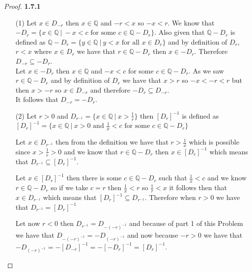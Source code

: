 \documentclass[11pt]{article}
\newcommand{\Q}{\mathbb{Q}}
\theoremstyle{definition}
\begin{document}
    \begin{proof}{\textbf{1.7.1}}
    \begin{itemize}
        \item [(1)]
        Let $x \in D_{-r}$ then $x \in \Q$ and $-r<x$ so $-x<r$. We know that 
        $-D_r = \{x \in \Q ~|~ -x<c\text{ for some }c \in \Q-D_r\}$. Also given that 
        $\Q-D_r$ is defined as $\Q - D_r = \{y \in \Q ~|~ y<x \text{ for all } x \in D_r\}$
        and by definition of $D_r$, $r < x$ where $x \in D_r$ we have that
        $r \in \Q - D_r$ then $x \in -D_r$. Therefore $D_{-r} \subseteq -D_r$.\\
        Let $x \in -D_{r}$ then $x \in \Q$ and $-x<c$ for some $c \in \Q-D_r$. As we
        saw $r \in \Q-D_r$ and by definition of $D_r$ we have that $x>r$ so $-x<-r<r$
        but then $x>-r$ so $x \in D_{-r}$ and therefore $-D_r \subseteq D_{-r}$.\\
        It follows that $D_{-r} = -D_r$.
        \item [(2)]
        Let $r>0$ and $D_{r^{-1}} = \{x \in \Q ~|~ x>\frac{1}{r}\}$ then $[D_r]^{-1}$
        is defined as
        $[D_r]^{-1} = \{x \in \Q ~|~ x>0 \text{ and }\frac{1}{x}<c\text{ for some }c \in \Q-D_r\}$
        
        Let $x \in D_{r^{-1}}$ then from the definition we have that $r > \frac{1}{x}$
        which is possible since $x>\frac{1}{r}>0$ and we know that
        $r \in \Q-D_r$ then $x \in [D_r]^{-1}$ which means that $D_{r^{-1}}\subseteq [D_r]^{-1}$.
        
        Let $x \in [D_r]^{-1}$ then there is some $c \in \Q - D_r$ such that
        $\frac{1}{x}<c$ and we know $r \in \Q - D_r$ so if we take $c=r$ then
        $\frac{1}{x}<r$ so $\frac{1}{r}<x$ it follows then that $x \in D_{r^{-1}}$ which
        means that $[D_r]^{-1}\subseteq D_{r^{-1}}$.
        Therefore when $r>0$ we have that $D_{r^{-1}}=[D_r]^{-1}$

        Let now $r<0$ then $D_{r^{-1}} = D_{-(-r)^{-1}}$ and because of part 1 of this
        Problem we have that $D_{-(-r)^{-1}} = -D_{(-r)^{-1}}$ and now because $-r>0$ we
        have that $-D_{(-r)^{-1}} = -[D_{-r}]^{-1} = -[-D_r]^{-1} = [D_r]^{-1}$.        
    \end{itemize}
    \end{proof}
\cleardoublepage
\end{document}
